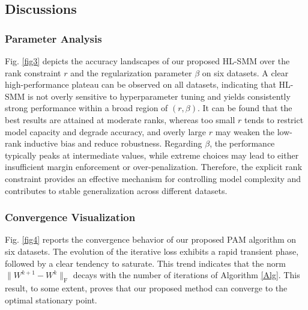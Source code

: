 \documentclass[sn-mathphys]{JORSC-jnl}%
\theoremstyle{thmstyleone}%
\theoremstyle{thmstylethree}%
\theoremstyle{thmstyleone} %
\begin{document}
\subsection{Discussions}
\subsubsection{Parameter  Analysis}\label{para_sen}
Fig. \ref{fig3} depicts the accuracy landscapes of our proposed HL-SMM over the rank constraint $r$ and the regularization parameter $\beta$ on six datasets.
A clear high-performance plateau can be observed on all datasets, indicating that HL-SMM is not overly sensitive to hyperparameter tuning and yields consistently strong performance within a broad region of $(r,\beta)$.
It can be found that the best results are attained at moderate ranks, whereas too small $r$ tends to restrict model capacity and degrade accuracy, and overly large $r$ may weaken the low-rank inductive bias and reduce robustness.
Regarding $\beta$, the performance typically peaks at intermediate values, while extreme choices may lead to either insufficient margin enforcement or over-penalization.
Therefore, the explicit rank constraint provides an effective mechanism for controlling model complexity and contributes to stable generalization across different datasets.




\subsubsection{Convergence Visualization}
Fig. \ref{fig4} reports the convergence behavior of our proposed PAM algorithm on six  datasets.
The evolution of the iterative loss exhibits a rapid transient phase, followed by a clear tendency to saturate.
This trend indicates that the norm $\|W^{k+1} - W^k\|_\textrm{F}$ decays with the number of iterations of Algorithm \ref{Alg}. 
This result, to some extent, proves that our proposed method can converge to the optimal stationary point.
\end{document}
